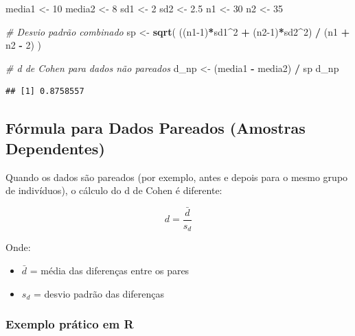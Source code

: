\documentclass[
]{book}
\newenvironment{Shaded}{\begin{snugshade}}{\end{snugshade}}
\newcommand{\CommentTok}[1]{\textcolor[rgb]{0.56,0.35,0.01}{\textit{#1}}}
\newcommand{\DecValTok}[1]{\textcolor[rgb]{0.00,0.00,0.81}{#1}}
\newcommand{\FloatTok}[1]{\textcolor[rgb]{0.00,0.00,0.81}{#1}}
\newcommand{\FunctionTok}[1]{\textcolor[rgb]{0.13,0.29,0.53}{\textbf{#1}}}
\newcommand{\NormalTok}[1]{#1}
\newcommand{\OtherTok}[1]{\textcolor[rgb]{0.56,0.35,0.01}{#1}}
\newcommand{\SpecialCharTok}[1]{\textcolor[rgb]{0.81,0.36,0.00}{\textbf{#1}}}
\providecommand{\tightlist}{%
  \setlength{\itemsep}{0pt}\setlength{\parskip}{0pt}}
\begin{document}
\begin{Shaded}
\begin{Highlighting}[]
\NormalTok{media1 }\OtherTok{\textless{}{-}} \DecValTok{10}
\NormalTok{media2 }\OtherTok{\textless{}{-}} \DecValTok{8}
\NormalTok{sd1 }\OtherTok{\textless{}{-}} \DecValTok{2}
\NormalTok{sd2 }\OtherTok{\textless{}{-}} \FloatTok{2.5}
\NormalTok{n1 }\OtherTok{\textless{}{-}} \DecValTok{30}
\NormalTok{n2 }\OtherTok{\textless{}{-}} \DecValTok{35}

\CommentTok{\# Desvio padrão combinado}
\NormalTok{sp }\OtherTok{\textless{}{-}} \FunctionTok{sqrt}\NormalTok{( ((n1}\DecValTok{{-}1}\NormalTok{)}\SpecialCharTok{*}\NormalTok{sd1}\SpecialCharTok{\^{}}\DecValTok{2} \SpecialCharTok{+}\NormalTok{ (n2}\DecValTok{{-}1}\NormalTok{)}\SpecialCharTok{*}\NormalTok{sd2}\SpecialCharTok{\^{}}\DecValTok{2}\NormalTok{) }\SpecialCharTok{/}\NormalTok{ (n1 }\SpecialCharTok{+}\NormalTok{ n2 }\SpecialCharTok{{-}} \DecValTok{2}\NormalTok{) )}

\CommentTok{\# d de Cohen para dados não pareados}
\NormalTok{d\_np }\OtherTok{\textless{}{-}}\NormalTok{ (media1 }\SpecialCharTok{{-}}\NormalTok{ media2) }\SpecialCharTok{/}\NormalTok{ sp}
\NormalTok{d\_np}
\end{Highlighting}
\end{Shaded}

\begin{verbatim}
## [1] 0.8758557
\end{verbatim}

\subsection{Fórmula para Dados Pareados (Amostras Dependentes)}\label{fuxf3rmula-para-dados-pareados-amostras-dependentes}

Quando os dados são pareados (por exemplo, antes e depois para o mesmo grupo de indivíduos), o cálculo do d de Cohen é diferente:

\[
d = \frac{\bar{d}}{s_d}
\]

Onde:

\begin{itemize}
\tightlist
\item
  \(\bar{d}\) = média das diferenças entre os pares\\
\item
  \(s_d\) = desvio padrão das diferenças
\end{itemize}

\subsubsection{Exemplo prático em R}\label{exemplo-pruxe1tico-em-r-1}
\end{document}
